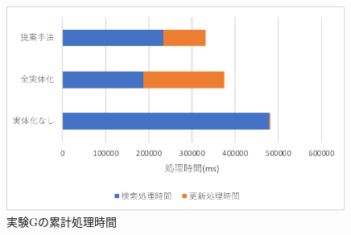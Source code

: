 \documentclass[a4paper,11pt]{ujreport}
\begin{document}
\begin{figure}[htbp]
	\begin{center}
		\includegraphics[width=30em]{src/ExperimentG-total.pdf} %
	\end{center}
	\caption{実験Gの累計処理時間}
	\label{figure:ExperimentG-total}
\end{figure}
\end{document}
